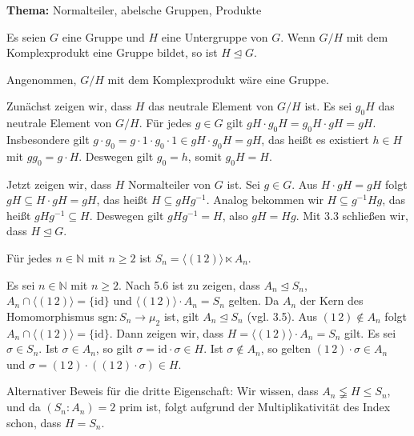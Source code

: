 \begin{uebungsblatt}

\textbf{Thema:} Normalteiler, abelsche Gruppen, Produkte
\vspace{0.5cm}
%
\setcounter{taskcount}{23}
%
\begin{uebung}
	Es seien $G$ eine Gruppe und $H$ eine Untergruppe von $G$. Wenn $G/H$ mit dem Komplexprodukt eine Gruppe bildet, so ist $H\unlhd G$.
\end{uebung}
\begin{loesung}
	Angenommen, $G/H$ mit dem Komplexprodukt wäre eine Gruppe. 
	
	Zunächst zeigen wir, dass $H$ das neutrale Element von $G/H$ ist. Es sei $g_0H$ das neutrale Element von $G/H$. Für jedes $g\in G$ gilt $gH\cdot g_0H=g_0H\cdot gH=gH$. Insbesondere gilt $g\cdot g_0=g\cdot 1\cdot g_0\cdot 1\in gH\cdot g_0H=gH$, das heißt es existiert $h\in H$ mit $gg_0=g\cdot H$. Deswegen gilt $g_0=h$, somit $g_0H=H$.
	
	Jetzt zeigen wir, dass $H$ Normalteiler von $G$ ist. Sei $g\in G$. Aus $H\cdot gH=gH$ folgt $gH\subseteq H\cdot gH=gH$, das heißt $H\subseteq gHg^{-1}$. Analog bekommen wir $H\subseteq g^{-1}Hg$, das heißt $gHg^{-1}\subseteq H$. Deswegen gilt $gHg^{-1}=H$, also $gH=Hg$. Mit 3.3 schließen wir, dass $H\unlhd G$.
\end{loesung}

\begin{uebung}
	Für jedes $n\in\mathbb{N}$ mit $n\ge 2$ ist $S_n=\langle (1\, 2)\rangle\ltimes A_n$.
\end{uebung}
\begin{loesung}
	Es sei $n\in\mathbb{N}$ mit $n\ge 2$. Nach 5.6 ist zu zeigen, dass $A_n\unlhd S_n$, $A_n\cap \langle (1\, 2)\rangle=\{\text{id}\}$ und $\langle (1\, 2)\rangle\cdot A_n=S_n$ gelten. Da $A_n$ der Kern des Homomorphismus $\text{sgn}: S_n\to\mu_2$ ist, gilt $A_n\unlhd S_n$ (vgl. 3.5). Aus $(1\, 2)\notin A_n$ folgt $A_n\cap \langle (1\, 2)\rangle=\{\text{id}\}$. Dann zeigen wir, dass $H=\langle (1\, 2)\rangle\cdot A_n=S_n$ gilt. Es sei $\sigma\in S_n$. Ist $\sigma\in A_n$, so gilt $\sigma=\text{id}\cdot\sigma\in H$. Ist $\sigma\notin A_n$, so gelten $(1\, 2)\cdot\sigma\in A_n$ und $\sigma=(1\, 2)\cdot ((1\, 2)\cdot \sigma)\in H$.
	
	Alternativer Beweis für die dritte Eigenschaft: Wir wissen, dass $A_n\lneqq H\le S_n$, und da $(S_n\colon A_n)=2$ prim ist, folgt aufgrund der Multiplikativität des Index schon, dass $H=S_n$.
\end{loesung}


\end{uebungsblatt}
